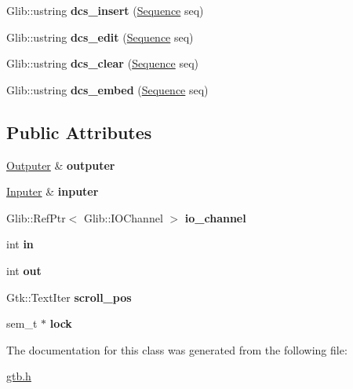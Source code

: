 \begin{DoxyCompactItemize}
Glib\+::ustring {\bfseries dcs\+\_\+insert} (\hyperlink{a00020}{Sequence} seq)
\item 
\mbox{\label{a00048_a138d596d5c6419ce8e7b8fe0a3892dc4}} 
Glib\+::ustring {\bfseries dcs\+\_\+edit} (\hyperlink{a00020}{Sequence} seq)
\item 
\mbox{\label{a00048_a492baf19b2f0af59cfaa2e6c1d7e0de7}} 
Glib\+::ustring {\bfseries dcs\+\_\+clear} (\hyperlink{a00020}{Sequence} seq)
\item 
\mbox{\label{a00048_a7b77ee0ab4692cf5b787df9018359ecf}} 
Glib\+::ustring {\bfseries dcs\+\_\+embed} (\hyperlink{a00020}{Sequence} seq)
\end{DoxyCompactItemize}
\subsection*{Public Attributes}
\begin{DoxyCompactItemize}
\item 
\mbox{\label{a00048_a4fc2df37ff31426309ab5b126ed08fe5}} 
\hyperlink{a00040}{Outputer} \& {\bfseries outputer}
\item 
\mbox{\label{a00048_a5da43092c0b6387513d66846127822ac}} 
\hyperlink{a00044}{Inputer} \& {\bfseries inputer}
\item 
\mbox{\label{a00048_ae6f910dbf841326fae3b4b203be52eda}} 
Glib\+::\+Ref\+Ptr$<$ Glib\+::\+I\+O\+Channel $>$ {\bfseries io\+\_\+channel}
\item 
\mbox{\label{a00048_acaafbd26faf38b2e2313e4aeabdef4d1}} 
int {\bfseries in}
\item 
\mbox{\label{a00048_a782ca1e6f668e7c26664e5bf393407cd}} 
int {\bfseries out}
\item 
\mbox{\label{a00048_a366878f4a7789d22fe82c89b940b38dc}} 
Gtk\+::\+Text\+Iter {\bfseries scroll\+\_\+pos}
\item 
\mbox{\label{a00048_a45bc17b8a501934841af9d288a75021c}} 
sem\+\_\+t $\ast$ {\bfseries lock}
\end{DoxyCompactItemize}


The documentation for this class was generated from the following file\+:\begin{DoxyCompactItemize}
\item 
\hyperlink{a00005}{gtb.\+h}\end{DoxyCompactItemize}
